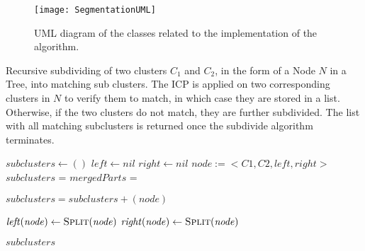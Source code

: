 \begin{figure}
	\centering
	\texttt{[image: SegmentationUML]}
	\caption{UML diagram of the classes related to the implementation of the algorithm.}
	\label{fig:UML}
\end{figure}

\begin{algorithm}[tbp]
	\caption{Recursive subdividing of two clusters $C_1$ and $C_2$, in the form of a Node $\mathit{N}$ in a Tree, into matching sub clusters. The ICP is applied on two corresponding clusters in $\mathit{N}$ to verify them to match, in which case they are stored in a list. Otherwise, if the two clusters do not match, they are further subdivided. The list with all matching subclusters is returned once the subdivide algorithm terminates.}
	\label{alg:subdivide}
	
		\begin{algorithmic}[1]     %
			\label{clusterTree}
			
			\State $\mathit{subclusters} \gets ()$
			\State $\mathit{left} \gets \mathit{nil}$
			\State $\mathit{right} \gets \mathit{nil}$
			\State $\mathit{node:=<C1, C2, left, right>}$
			\State $\mathit{subclusters}$ = 
			\State $\mathit{mergedParts}$ =
			
			\EndProcedure
		\end{algorithmic}
	
	\begin{algorithmic}[1]     %
		\label{subdivide}
		
		\State $\mathit{subclusters = subclusters + (node)}$
		
		\Else
		\State $\mathit{left(node) \gets \Call{Split}{node}}$
		\State $\mathit{right(node) \gets \Call{Split}{node}}$
		\State {}
		\State {}
		\EndIf
		
		\State\Return $\mathit{subclusters}$
		\EndProcedure
			
	\end{algorithmic}
\end{algorithm}

